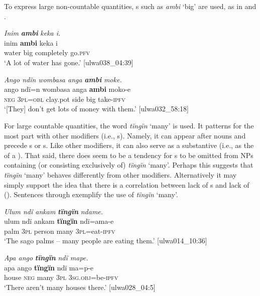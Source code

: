 To express large non-countable quantities, s such as \textit{ambi} ‘big’ are used, as in  and .

\ea%
    \label{ex:det:209}
          \textit{Inim} \textbf{\textit{ambi}} \textit{keka i.}\\
\gll    inim  \textbf{ambi}  keka      i\\
    water  big    completely  go.\textsc{pfv}\\
\glt `A lot of water has gone.’ [ulwa038\_04:39]
\z

\ea%
    \label{ex:det:210}
          \textit{Ango ndïn wombasa anga} \textbf{\textit{ambi}} \textit{moke.}\\
\gll    ango  ndï=n    wombasa  anga  \textbf{ambi}  moko-e\\
    \textsc{neg}  \textsc{3pl=obl}  clay.pot  side  big    take-\textsc{ipfv}\\
\glt `[They] don’t get lots of money with them.’ [ulwa032\_58:18]
\z

For large countable quantities, the word \textit{tïngïn} ‘many’ is used. It patterns for the most part with other modifiers (i.e., s). Namely, it can appear after nouns and precede s or s. Like other modifiers, it can also serve as a substantive (i.e., as the  of a ). That said, there does seem to be a tendency for s to be omitted from NPs containing (or consisting exclusively of) \textit{tïngïn} ‘many’. Perhaps this suggests that \textit{tïngïn} ‘many’ behaves differently from other modifiers. Alternatively it may simply support the idea that there is a correlation between lack of s and lack of  (). Sentences  through  exemplify the use of \textit{tïngïn} ‘many’.


\ea%
    \label{ex:det:211}
          \textit{Ulum ndï ankam} \textbf{\textit{tïngïn}} \textit{ndame.}\\
\gll    ulum  ndï  ankam  \textbf{tïngïn}  ndï=ama-e\\
    palm  3\textsc{pl}  person  many  3\textsc{pl}=eat-\textsc{ipfv}\\
\glt `The sago palms -- many people are eating them.’ [ulwa014\_10:36]
\z

\ea%
    \label{ex:det:212}
          \textit{Apa ango} \textbf{\textit{tïngïn}} \textit{ndï mape.}\\
\gll    apa  ango    \textbf{tïngïn}  ndï  ma=p-e\\
    house  \textsc{neg}  many  3\textsc{pl}  \textsc{3sg.obj}=be\textsc{{}-ipfv}\\
\glt `There aren’t many houses there.’ [ulwa028\_04:5]
\z

